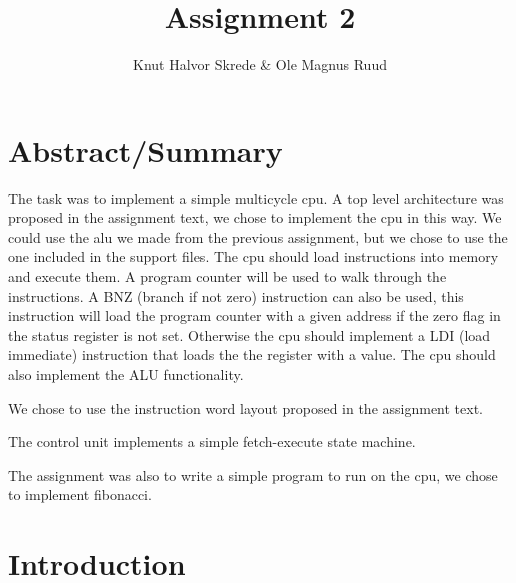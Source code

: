 \documentclass[10pt]{report}
\title{Assignment 2}
\author{Knut Halvor Skrede \& Ole Magnus Ruud}
\begin{document}
	\maketitle
	\clearpage


	\section*{Abstract/Summary}


	The task was to implement a simple multicycle cpu. A top level architecture was proposed in the assignment text, we chose to implement the cpu in this way. We could use the alu we made from the previous assignment, but we chose to use the one included in the support files. The cpu should load instructions into memory and execute them. A program counter will be used to walk through the instructions. A BNZ (branch if not zero) instruction can also be used, this instruction will load the program counter with a given address if the zero flag in the status register is not set. Otherwise the cpu should implement a LDI (load immediate) instruction that loads the the register with a value. The cpu should also implement the ALU functionality.

We chose to use the instruction word layout proposed in the assignment text.

The control unit implements a simple fetch-execute state machine.

The assignment was also to write a simple program to run on the cpu, we chose to implement fibonacci.

	\section*{Introduction}

\end{document}
